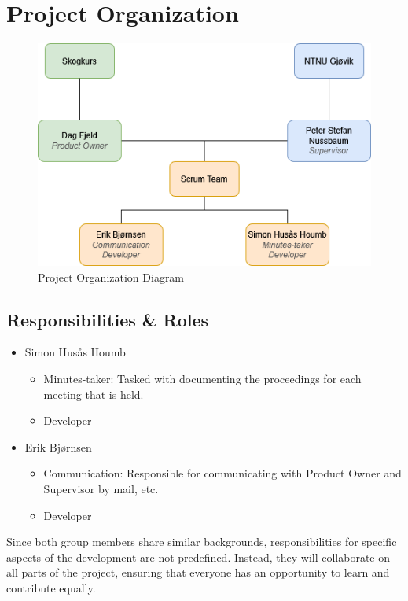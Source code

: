 \section{Project Organization}
    \begin{figure}[H]
    \centering
    \includegraphics[width=0.75\linewidth]{Images/project_organization.png}
    \caption{Project Organization Diagram}
    \label{fig:prj_org}
\end{figure}

\subsection{Responsibilities \& Roles}

\begin{itemize}
    \item Simon Husås Houmb
    \begin{itemize}
        \item Minutes-taker: Tasked with documenting the proceedings for each meeting that is held.
        \item Developer
    \end{itemize}
    \item Erik Bjørnsen
    \begin{itemize}
        \item Communication: Responsible for communicating with Product Owner and Supervisor by mail, etc.
        \item Developer
    \end{itemize}
\end{itemize}

Since both group members share similar backgrounds, responsibilities for specific aspects of the development are not predefined. Instead, they will collaborate on all parts of the project, ensuring that everyone has an opportunity to learn and contribute equally.


